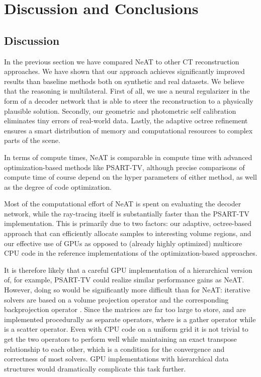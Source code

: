 \documentclass[acmtog,nonacm]{acmart} \acmSubmissionID{0438}
\newcommand{\neat}{NeAT\xspace}
\begin{document}
\section{Discussion and Conclusions}
\label{sec:discuss}

\subsection{Discussion}
In the previous section we have compared \neat to other CT reconstruction approaches.
We have shown that our approach achieves significantly improved results than baseline methods both on synthetic and real datasets. We believe that the reasoning is multilateral.
First of all, we use a neural regularizer in the form of a decoder network that is able to steer the reconstruction to a physically plausible solution. 
Secondly, our geometric and photometric self calibration eliminates tiny errors of real-world data.
Lastly, the adaptive octree refinement ensures a smart distribution of memory and computational resources to complex parts of the scene.

In terms of compute times, \neat is comparable in compute time with
advanced optimization-based methods like PSART-TV, although precise
comparisons of compute time of course depend on the hyper parameters of
either method, as well as the degree of code optimization. 

Most of the computational effort of \neat is spent on evaluating the
decoder network, while the ray-tracing itself is substantially faster
than the PSART-TV implementation. This is primarily due to two factors:
our adaptive, octree-based approach that can efficiently allocate
samples to interesting volume regions, and our effective use of GPUs
as opposed to (already highly optimized) multicore CPU code in the
reference implementations of the optimization-based approaches.

It is therefore likely that a careful GPU implementation of a
hierarchical version of, for example, PSART-TV could realize similar
performance gains as \neat. However, doing so would be significantly
more difficult than for \neat: iterative solvers are based on a volume
projection operator  and the corresponding backprojection
operator . Since the matrices are far too large to store,
 and  are implemented procedurally as separate
operators, where  is a gather operator while  is
a scatter operator. Even with CPU code on a uniform grid it is not
trivial to get the two operators to perform well while maintaining an
exact transpose relationship to each other, which is a condition for
the convergence and correctness of most solvers. GPU implementations
with hierarchical data structures would dramatically complicate this
task further.
\end{document}
